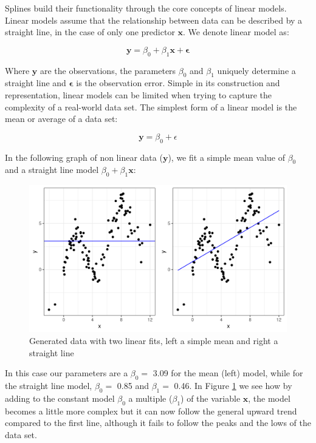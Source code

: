 \documentclass[
]{book}
\begin{document}
Splines build their functionality through the core concepts of linear models. Linear models assume that the relationship between data can be described by a straight line, in the case of only one predictor \(\mathbf{x}\).
We denote linear model as:

\[\mathbf{y} = \beta_0 + \beta_1\mathbf{x} + \mathbf{\epsilon}\]

Where \(\mathbf{y}\) are the observations, the parameters \(\beta_0\) and \(\beta_1\) uniquely determine a straight line and \(\mathbf{\epsilon}\) is the observation error. Simple in its construction and representation, linear models can be limited when trying to capture the complexity of a real-world data set. The simplest form of a linear model is the mean or average of a data set:

\[\mathbf{y} = \beta_0 + \epsilon\]

In the following graph of non linear data (\(\mathbf{y}\)), we fit a simple mean value of \(\beta_0\) and a straight line model \(\beta_0 + \beta_1\mathbf{x}\):

\begin{figure}
\centering
\includegraphics{_bookdown_files/_main_files/figure-html/meanandlinear-1.png}
\caption{\label{fig:meanandlinear}Generated data with two linear fits, left a simple mean and right a straight line}
\end{figure}

In this case our parameters are a \(\beta_0 =\) 3.09 for the mean (left) model, while for the straight line model, \(\beta_0 =\) 0.85 and \(\beta_1 =\) 0.46. In Figure \ref{fig:meanandlinear} we see how by adding to the constant model \(\beta_0\) a multiple (\(\beta_1\)) of the variable \(\mathbf{x}\), the model becomes a little more complex but it can now follow the general upward trend compared to the first line, although it fails to follow the peaks and the lows of the data set.
\end{document}
